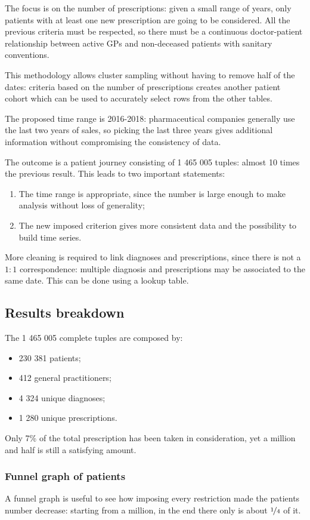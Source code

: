 The focus is on the number of prescriptions: given a small range of years, only patients with at least one new prescription are going to be considered. All the previous criteria must be respected, so there must be a continuous doctor-patient relationship between active GPs and non-deceased patients with sanitary conventions.

This methodology allows cluster sampling without having to remove half of the dates: criteria based on the number of prescriptions creates another patient cohort which can be used to accurately select rows from the other tables.

The proposed time range is 2016-2018: pharmaceutical companies generally use the last two years of sales, so picking the last three years gives additional information without compromising the consistency of data.

The outcome is a patient journey consisting of 1 465 005 tuples: almost 10 times the previous result. This leads to two important statements:
\begin{enumerate}
	\item The time range is appropriate, since the number is large enough to make analysis without loss of generality;
	\item The new imposed criterion gives more consistent data and the possibility to build time series.
\end{enumerate}

More cleaning is required to link diagnoses and prescriptions, since there is not a $1 : 1$ correspondence: multiple diagnosis and prescriptions may be associated to the same date. This can be done using a lookup table.

\subsection{Results breakdown}
The 1 465 005 complete tuples are composed by:
\begin{itemize}
	\item 230 381 patients;
	\item 412 general practitioners;
	\item 4 324 unique diagnoses;
	\item 1 280 unique prescriptions.
\end{itemize}

Only 7\% of the total prescription has been taken in consideration, yet a million and half is still a satisfying amount.

\subsubsection{Funnel graph of patients}
A funnel graph is useful to see how imposing every restriction made the patients number decrease: starting from a million, in the end there only is about $\nicefrac{1}{4}$ of it.

